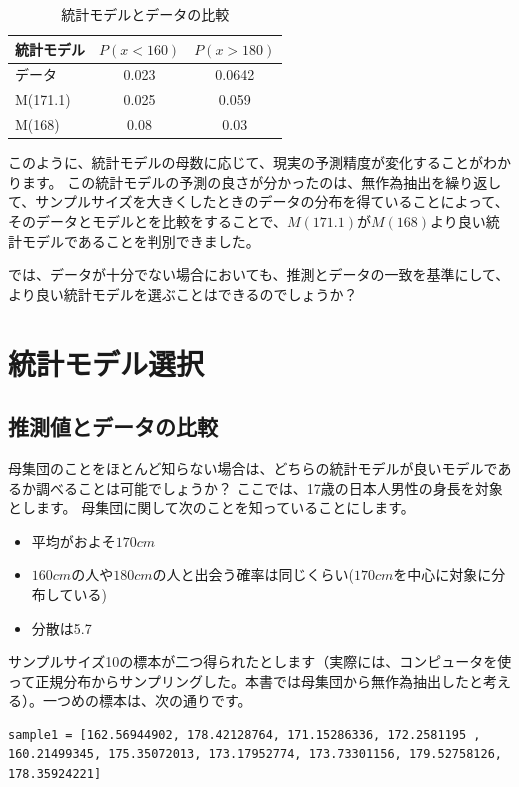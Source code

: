 \begin{table}[hbtp]
    \caption{統計モデルとデータの比較}
    \label{table:data_type}
    \centering
    \begin{tabular}{lcc}
    統計モデル  & $P(x<160)$  & $P(x>180)$   \\
    \hline \hline
    データ &  0.023 &  0.0642\\
    M(171.1) & 0.025 & 0.059  \\
    M(168) &  0.08 & 0.03 \\
      \hline
    \end{tabular}
  \end{table}

このように、統計モデルの母数に応じて、現実の予測精度が変化することがわかります。
この統計モデルの予測の良さが分かったのは、無作為抽出を繰り返して、サンプルサイズを大きくしたときのデータの分布を得ていることによって、
そのデータとモデルとを比較をすることで、$M(171.1)$が$M(168)$より良い統計モデルであることを判別できました。

では、データが十分でない場合においても、推測とデータの一致を基準にして、より良い統計モデルを選ぶことはできるのでしょうか？
\section{統計モデル選択}
\subsection{推測値とデータの比較}
母集団のことをほとんど知らない場合は、どちらの統計モデルが良いモデルであるか調べることは可能でしょうか？
ここでは、17歳の日本人男性の身長を対象とします。
母集団に関して次のことを知っていることにします。
\begin{itemize}
    \item 平均がおよそ$170cm$
    \item $160cm$の人や$180cm$の人と出会う確率は同じくらい($170cm$を中心に対象に分布している)
    \item 分散は5.7
\end{itemize}

サンプルサイズ10の標本が二つ得られたとします（実際には、コンピュータを使って正規分布からサンプリングした。本書では母集団から無作為抽出したと考える）。一つめの標本は、次の通りです。

\begin{lstlisting}
sample1 = [162.56944902, 178.42128764, 171.15286336, 172.2581195 , 160.21499345, 175.35072013, 173.17952774, 173.73301156, 179.52758126, 178.35924221]
\end{lstlisting}



